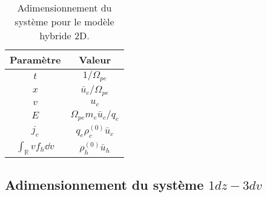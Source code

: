 \begin{table}[h]
  \centering
  \begin{tabular}{c|c}
    Paramètre & Valeur \\
    \hline
    $t$                            & $1/\Omega_{pe}$                 \\
    $x$                            & $\bar{u}_c/\Omega_{pe}$         \\ 
    $v$                            & $u_c$                           \\ 
    $E$                            & $ \Omega_{pe}m_e \bar{u}_c/q_e$ \\ 
    $j_c$                          & $q_e \rho_c^{(0)} \bar{u}_c$    \\ 
    $\int_{\mathbb{R}}vf_h \dd{v}$ & $\rho_h^{(0)} \bar{u}_h$        \\ 
  \end{tabular}
  \caption{Adimensionnement du système pour le modèle hybride 2D.}
  \label{dim1d}
\end{table}

\subsection{Adimensionnement du système $1dz-3dv$}

